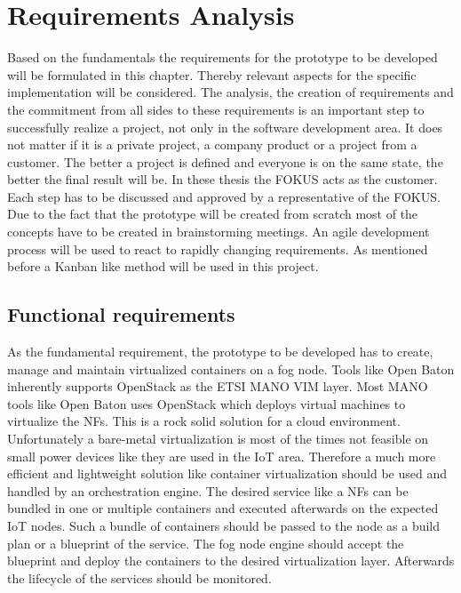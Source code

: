 \chapter{Requirements Analysis}
\label{chapter:requirements-analysis}
\minitoc\vspace{.5cm}
Based on the fundamentals the requirements for the prototype to be developed will be formulated in this chapter.
Thereby relevant aspects for the specific implementation will be considered.
The analysis, the creation of requirements and the commitment from all sides to these requirements is an important step to successfully realize a project, not only in the software development area.
It does not matter if it is a private project, a company product or a project from a customer.
The better a project is defined and everyone is on the same state, the better the final result will be.
In these thesis the \ac{FOKUS} acts as the customer.
Each step has to be discussed and approved by a representative of the \ac{FOKUS}.
Due to the fact that the prototype will be created from scratch most of the concepts have to be created in brainstorming meetings.
An agile development process will be used to react to rapidly changing requirements.
As mentioned before a Kanban like method will be used in this project.


\section{Functional requirements}
\label{section:functional-requirements}
As the fundamental requirement, the prototype to be developed has to create, manage and maintain virtualized containers on a fog node.
Tools like Open Baton inherently supports OpenStack as the \ac{ETSI} \ac{MANO} \ac{VIM} layer.
Most \ac{MANO} tools like Open Baton uses OpenStack which deploys virtual machines to virtualize the \acp{NF}.
This is a rock solid solution for a cloud environment.
Unfortunately a bare-metal virtualization is most of the times not feasible on small power devices like they are used in the \ac{IoT} area.
Therefore a much more efficient and lightweight solution like container virtualization should be used and handled by an orchestration engine.
The desired service like a \acp{NF} can be bundled in one or multiple containers and executed afterwards on the expected \ac{IoT} nodes.
Such a bundle of containers should be passed to the node as a build plan or a blueprint of the service.
The fog node engine should accept the blueprint and deploy the containers to the desired virtualization layer.
Afterwards the lifecycle of the services should be monitored.

